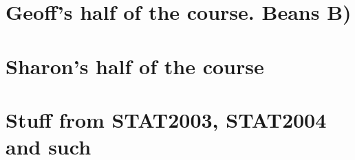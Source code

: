 \documentclass[a4paper,12pt]{report}
\begin{document}



\part{Geoff's half of the course. Beans B)}




\part{Sharon's half of the course}

\part{Stuff from STAT2003, STAT2004 and such}

\end{document}
